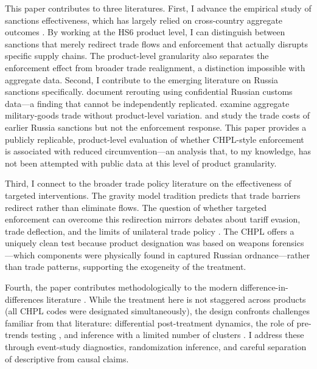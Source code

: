 \documentclass[12pt]{article}
\begin{document}
This paper contributes to three literatures. First, I advance the empirical study of sanctions effectiveness, which has largely relied on cross-country aggregate outcomes \citep{hufbauer2007economic, drezner1999sanctions, bapat2013determinants}. By working at the HS6 product level, I can distinguish between sanctions that merely redirect trade flows and enforcement that actually disrupts specific supply chains. The product-level granularity also separates the enforcement effect from broader trade realignment, a distinction impossible with aggregate data. Second, I contribute to the emerging literature on Russia sanctions specifically. \citet{egorov2024sanctions} document rerouting using confidential Russian customs data---a finding that cannot be independently replicated. \citet{scheckenhofer2025aggregate} examine aggregate military-goods trade without product-level variation. \citet{crozet2020friendly} and \citet{felbermayr2020sanctions} study the trade costs of earlier Russia sanctions but not the enforcement response. This paper provides a publicly replicable, product-level evaluation of whether CHPL-style enforcement is associated with reduced circumvention---an analysis that, to my knowledge, has not been attempted with public data at this level of product granularity.

Third, I connect to the broader trade policy literature on the effectiveness of targeted interventions. The gravity model tradition \citep{anderson2003gravity, head2014gravity} predicts that trade barriers redirect rather than eliminate flows. The question of whether targeted enforcement can overcome this redirection mirrors debates about tariff evasion, trade deflection, and the limits of unilateral trade policy \citep{fajgelbaum2020return, amiti2019impact}. The CHPL offers a uniquely clean test because product designation was based on weapons forensics---which components were physically found in captured Russian ordnance---rather than trade patterns, supporting the exogeneity of the treatment.

Fourth, the paper contributes methodologically to the modern difference-in-differences literature \citep{callaway2021difference, goodmanbacon2021difference}. While the treatment here is not staggered across products (all CHPL codes were designated simultaneously), the design confronts challenges familiar from that literature: differential post-treatment dynamics, the role of pre-trends testing \citep{roth2022pretest}, and inference with a limited number of clusters \citep{cameron2008bootstrap}. I address these through event-study diagnostics, randomization inference, and careful separation of descriptive from causal claims.
\end{document}
